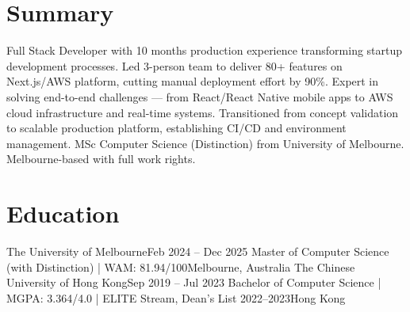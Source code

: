 \documentclass[letterpaper,11pt]{article}
\begin{document}
\makecvheader

\section{Summary}
\small{
Full Stack Developer with 10 months production experience transforming startup development processes. Led 3-person team to deliver 80+ features on Next.js/AWS platform, cutting manual deployment effort by 90\%. Expert in solving end-to-end challenges — from React/React Native mobile apps to AWS cloud infrastructure and real-time systems. Transitioned from concept validation to scalable production platform, establishing CI/CD and environment management. MSc Computer Science (Distinction) from University of Melbourne. Melbourne-based with full work rights.
}

\section{Education}
  \resumeSubHeadingListStart
    \resumeSubheading
      {The University of Melbourne}{Feb 2024 -- Dec 2025}
      {Master of Computer Science (with Distinction) | WAM: 81.94/100}{Melbourne, Australia}
    \resumeSubheading
      {The Chinese University of Hong Kong}{Sep 2019 -- Jul 2023}
      {Bachelor of Computer Science | MGPA: 3.364/4.0 | ELITE Stream, Dean's List 2022--2023}{Hong Kong}
  \resumeSubHeadingListEnd

\end{document}
